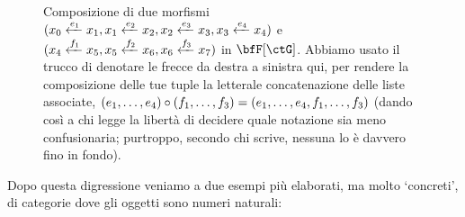 \begin{example}
\begin{figure}
\begin{center}
		\end{center}
		\caption{Composizione di due morfismi \((x_0 \xleftarrow{e_1} x_1, x_1 \xleftarrow{e_2} x_2 ,x_2 \xleftarrow{e_3} x_3, x_3 \xleftarrow{e_4} x_4)\) e \((x_4 \xleftarrow{f_1} x_5,x_5 \xleftarrow{f_2} x_6, x_6 \xleftarrow{f_3} x_7)\) in \(\bfF[\ctG]\). Abbiamo usato il trucco di denotare le frecce da destra a sinistra qui, per rendere la composizione delle tue tuple la letterale concatenazione delle liste associate,
			\((\tup e4,)\circ (\tup f3,) = (\tup e4,,\tup f3,)\)
			(dando così a chi legge la libertà di decidere quale notazione sia meno confusionaria; purtroppo, secondo chi scrive, nessuna lo è davvero fino in fondo).}
		\label{fig:enter-label}
	\end{figure}
\end{example}
Dopo questa digressione veniamo a due esempi più elaborati, ma molto `concreti', di categorie dove gli oggetti sono numeri naturali:
